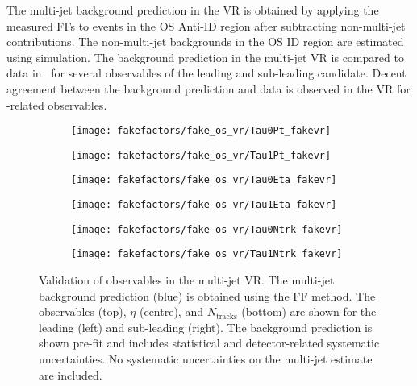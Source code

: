 The multi-jet background prediction in the VR is obtained by applying the
measured FFs to events in the OS Anti-ID region after subtracting non-multi-jet
contributions. The non-multi-jet backgrounds in the OS ID region are estimated
using simulation. The background prediction in the multi-jet VR is compared to
data in~ for several observables of the
leading and sub-leading \tauhadvis candidate. Decent agreement between the
background prediction and data is observed in the VR for \tauhadvis-related
observables.

\begin{figure}[htbp]
  \centering

  \begin{subfigure}{0.44\textwidth}
    \texttt{[image: fakefactors/fake\_os\_vr/Tau0Pt\_fakevr]}
  \end{subfigure}\hspace*{0.04\textwidth}%
  \begin{subfigure}{0.44\textwidth}
    \texttt{[image: fakefactors/fake\_os\_vr/Tau1Pt\_fakevr]}
  \end{subfigure}

  \begin{subfigure}{0.44\textwidth}
    \texttt{[image: fakefactors/fake\_os\_vr/Tau0Eta\_fakevr]}
  \end{subfigure}\hspace*{0.04\textwidth}%
  \begin{subfigure}{0.44\textwidth}
    \texttt{[image: fakefactors/fake\_os\_vr/Tau1Eta\_fakevr]}
  \end{subfigure}

  \begin{subfigure}{0.44\textwidth}
    \texttt{[image: fakefactors/fake\_os\_vr/Tau0Ntrk\_fakevr]}
  \end{subfigure}\hspace*{0.04\textwidth}%
  \begin{subfigure}{0.44\textwidth}
    \texttt{[image: fakefactors/fake\_os\_vr/Tau1Ntrk\_fakevr]}
  \end{subfigure}

  \caption{Validation of \tauhadvis observables in the multi-jet VR. The
    multi-jet background prediction (blue) is obtained using the FF method. The
    \tauhadvis observables \pT (top), $\eta$ (centre), and $N_{\text{tracks}}$
    (bottom) are shown for the leading (left) and sub-leading \tauhadvis
    (right). The background prediction is shown pre-fit and includes statistical
    and detector-related systematic uncertainties. No systematic uncertainties
    on the multi-jet estimate are included.}%
  \label{fig:fake_factor_OSVR_kinematics}
\end{figure}



